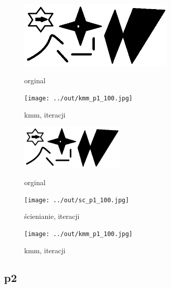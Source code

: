 \documentclass[a4paper,12pt]{article}
\begin{document}
\begin{figure}[h!]
\begin{minipage}[t]{7.5cm}
\begin{center}
\includegraphics[width=7.5cm]{../in/p1.jpg}
\caption{orginal}
\end{center}
\end{minipage}
\hfill
\begin{minipage}[t]{7.5cm}
\begin{center}
\texttt{[image: ../out/kmm\_p1\_100.jpg]}
\caption{kmm, \protect iteracji}
\end{center}
\end{minipage}
\end{figure}

\begin{figure}[h!]
\begin{minipage}[t]{5cm}
\begin{center}
\includegraphics[width=5cm]{../in/p1.jpg}
\caption{orginal}
\end{center}
\end{minipage}
\hfill
\begin{minipage}[t]{5cm}
\begin{center}
\texttt{[image: ../out/sc\_p1\_100.jpg]}
\caption{ścienianie, \protect iteracji}
\end{center}
\end{minipage}
\hfill
\begin{minipage}[t]{5cm}
\begin{center}
\texttt{[image: ../out/kmm\_p1\_100.jpg]}
\caption{kmm, \protect iteracji}
\end{center}
\end{minipage}
\end{figure}



\newpage
\subsection{p2}
\end{document}

